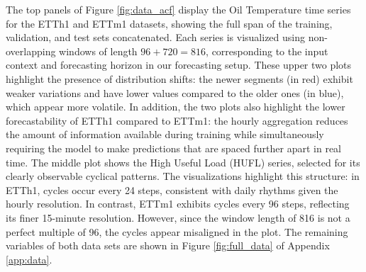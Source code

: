 \documentclass[a4paper,oneside,bibliography=totoc]{scrbook}
\begin{document}
The top panels of Figure \ref{fig:data_acf} display the Oil Temperature time series for the ETTh1 and ETTm1 datasets, showing the full span of the training, validation, and test sets concatenated. Each series is visualized using non-overlapping windows of length $96 + 720 = 816$, corresponding to the input context and forecasting horizon in our forecasting setup.
These upper two plots highlight the presence of distribution shifts: the newer segments (in red) exhibit weaker variations and have lower values compared to the older ones (in blue), which appear more volatile.
In addition, the two plots also highlight the lower forecastability of ETTh1 compared to ETTm1: the hourly aggregation reduces the amount of information available during training while simultaneously requiring the model to make predictions that are spaced further apart in real time.
The middle plot shows the High Useful Load (HUFL) series, selected for its clearly observable cyclical patterns. The visualizations highlight this structure: in ETTh1, cycles occur every 24 steps, consistent with daily rhythms given the hourly resolution. In contrast, ETTm1 exhibits cycles every 96 steps, reflecting its finer 15-minute resolution. However, since the window length of 816 is not a perfect multiple of 96, the cycles appear misaligned in the plot.
The remaining variables of both data sets are shown in Figure \ref{fig:full_data} of Appendix \ref{app:data}.
\end{document}
